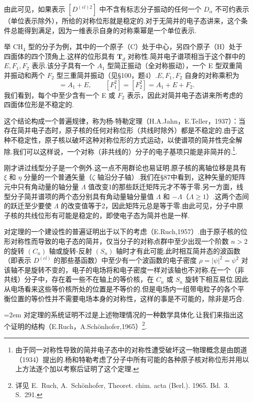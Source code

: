 由此可见，如果表示 $[D^{(el)2}]$ 中不含有标志分子振动的任何一个 $D_\alpha$ 不可约表示（单位表示除外），所给的对称位形就是稳定的.对于无简并的电子态讲来，这个条件总能得到满足，因为一维表示自身的对称乘幂是一个单位表示.

举 $\mathrm{CH_4}$ 型的分子为例，其中的一个原子（C）处于中心，另四个原子（H）处于四面体的四个顶角上.这样的位形具有 $\boldsymbol{T}_d$ 对称性.简并电子谱项相当于这个群中的 $E,F_1,F_2$ 表示.该分子具有一个 $A_1$ 型简正振动（全对称振动），一个 E 型双重简并振动和两个 $F_2$ 型三重简并振动（见§100，题4）.$E,F_1,F_2$ 自身的对称乘积为
\begin{equation*}
  [E^2]=A_1+E,\qquad[F_1^2]=[F_2^2]=A_1+E+F_2.
\end{equation*}
我们看到，每个中至少含有一个 E 或 $F_2$ 表示，因此对简并电子态讲来所考虑的四面体位形是不稳定的.

这个结论构成一个普遍规律，称为杨-特勒定理（H.A.Jahn，E.Teller，1937）：当存在简并电子态时，原子核的任何对称位形（共线时除外）都是不稳定的.由于这种不稳定性，原子核以破坏这种对称位形的方式运动，以使谱项的简并性完全解除.我们可以这样说，一个对称（非共线的）分子的电子基项只能是非简并的.\footnote{由于同一对称性导致的简并电子态中的对称性遭受破坏这一物理概念是由朗道（1934）提出的.杨和特勒考虑了分子中所有可能的各种原子核对称位形并用以上方法逐个加以考察后证明了这个定理.}.

刚才讲过线型分子是一个例外.这一点不用群论也易证明.原子核的离轴位移是具有 $\xi$ 和 $\eta$ 分量的一个普通矢量（$\zeta$ 轴沿分子轴）.我们在§87中看到，这种矢量的矩阵元中只有角动量的轴分量 $\Lambda$ 值改变1的那些跃迁矩阵元才不等于零.另一方面，线型分子简并谱项的两个态分别具有角动量轴分量值 $\Lambda$ 和 $-\Lambda$（$\Lambda\geqslant1$）.这两个态间的跃迁至少要使 $\Lambda$ 的改变值等于2，因此矩阵元总是等于零.由此可见，分子中原子核的共线位形有可能是稳定的，即使电子态为简并也是一样.

对定理的一个建设性的普遍证明出于以下的考虑（E.Ruch,1957）.由于原子核的位形对称性而导致的电子态的简并，仅当分子的对称点群中至少出现一个阶数 $n>2$ 的旋转 $(C_n)$ 轴或旋转-反射 $(S_n)$ 轴时才有此可能.此时相互简并态的波函数（即表示 $D^{(el)}$ 的那些基函数）中至少有一个波函数的电子密度 $\rho=|\psi|^2=\psi^2$ 对该轴不是旋转不变的，电子的电场将和电子密度一样对该轴也不对称.在一个（非共线）分子中，存在着一些不在轴上的等价核，在 $C_n$ 或 $S_n$ 旋转下相互易位.因此从电场看来这些等价核所处的位置是不等价的.但是电场内一组带电粒子的各个平衡位置的等价性并不需要电场本身的对称性，这样的事是不可能的，除非是巧合.

\emergencystretch=2em%
对定理的系统证明不过是上述物理情况的一种数学具体化.让我们来指出这个证明的结构（E.Ruch，A.Sch\"onhofer,1965）\footnote{详见 E.~Ruch, A.~Sch\"onhofer, Theoret. chim. acta (Berl.). 1965. Bd.~3. S.~291.}.

